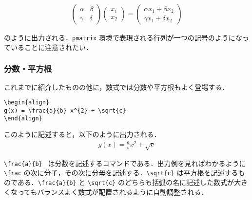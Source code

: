 \begin{align}
\begin{pmatrix}
\alpha & \beta
\\
\gamma & \delta
\end{pmatrix}
\begin{pmatrix}
x_{1}
\\
x_{2}
\end{pmatrix}
=
\begin{pmatrix}
\alpha x_{1} + \beta x_{2}
\\
\gamma x_{1} + \delta x_{2}
\end{pmatrix}
\end{align}

のように出力される．\verb|pmatrix| 環境で表現される行列が一つの記号のようになっていることに注意されたい．

\subsubsection{分数・平方根}

これまでに紹介したものの他に，数式では分数や平方根もよく登場する．

\begin{screen}
\begin{verbatim}
\begin{align}
g(x) = \frac{a}{b} x^{2} + \sqrt{c}
\end{align}
\end{verbatim}
\end{screen}
このように記述すると，以下のように出力される．
%
\begin{align}
g(x) = \frac{a}{b} x^{2} + \sqrt{c}
\end{align}

\verb|\frac{a}{b} | は分数を記述するコマンドである．出力例を見ればわかるように \verb|\frac| の次に分子，その次に分母を記述する．\verb|\sqrt{c}|  は平方根を記述するものである．\verb|\frac{a}{b}| と \verb|\sqrt{c}| のどちらも括弧の名に記述した数式が大きくなってもバランスよく数式が配置されるように自動調整される．
